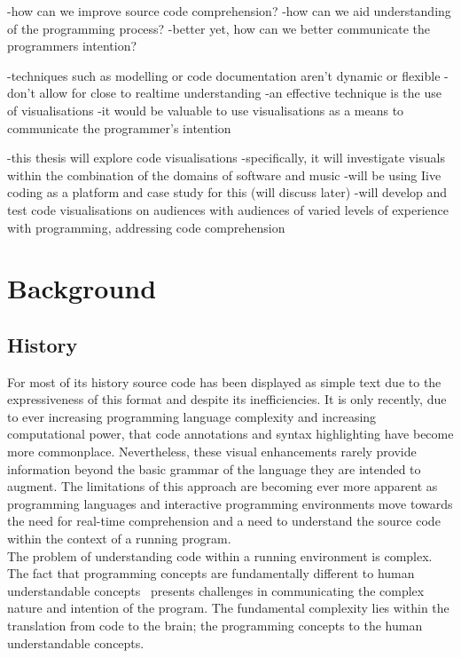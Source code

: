-how can we improve source code comprehension?
-how can we aid understanding of the programming process?
-better yet, how can we better communicate the programmers intention?

-techniques such as modelling or code documentation aren’t dynamic or flexible
-don’t allow for close to realtime understanding
-an effective technique is the use of visualisations
-it would be valuable to use visualisations as a means to communicate the programmer’s intention


-this thesis will explore code visualisations
-specifically, it will investigate visuals within the combination of the domains of software and music
-will be using Iive coding as a platform and case study for this (will discuss later)
-will develop and test code visualisations on audiences with audiences of varied levels of experience with programming, addressing code comprehension

\section{Background}
\label{sec:basis}

\subsection{History}

For most of its history source code has been displayed as simple text due to the expressiveness of this format and despite its inefficiencies. It is only recently, due to ever increasing programming language complexity and increasing computational power, that code annotations and syntax highlighting have become more commonplace. Nevertheless, these visual enhancements rarely provide information beyond the basic grammar of the language they are intended to augment. The limitations of this approach are becoming ever more apparent as programming languages and interactive programming environments move towards the need for real-time comprehension and a need to understand the source code within the context of a running program.\\

The problem of understanding code within a running environment is complex. The fact that programming concepts are fundamentally different to human understandable concepts~\cite{Biggerstaff1994} presents challenges in communicating the complex nature and intention of the program. The fundamental complexity lies within the translation from code to the brain; the programming concepts to the human understandable concepts.\\

